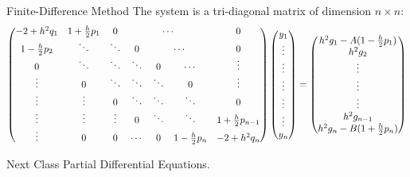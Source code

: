 \documentclass[11pt]{beamer}
\begin{document}
\begin{frame}[fragile]{Finite-Difference Method}
The system is a tri-diagonal matrix of dimension $n \times n$:
\tiny
\begin{equation}
\begin{pmatrix}
-2+h^2q_1 & 1+ \frac{h}{2}p_1& 0 &\multicolumn{3}{c}{\cdots} &0\\
1-\frac{h}{2} p_2&\ddots&\ddots & 0 &\multicolumn{2}{c}{\cdots} & 0\\
0 & \ddots & \ddots & \ddots & 0 & \cdots & \vdots\\
\vdots & 0 & \ddots & \ddots & \ddots & 0 & \vdots \\
\vdots & \vdots & 0 & \ddots & \ddots & \ddots & 0\\
\vdots & \vdots & \vdots& 0& \ddots & \ddots & 1+\frac{h}{2}p_{n-1}\\
\vdots & 0 & 0 & \cdots & 0 & 1-\frac{h}{2} p_n & -2+h^2 q_n\\
\end{pmatrix}
\begin{pmatrix}
y_1\\\vdots \\\vdots \\\vdots \\\vdots \\\vdots \\ y_n
\end{pmatrix}
= \begin{pmatrix}
h^2 g_1 - A(1-\frac{h}{2}p_1)\\
h^2 g_2\\
\vdots\\
\vdots\\
\vdots\\
h^2 g_{n-1}\\
h^2 g_n - B(1+\frac{h}{2}p_n)\\
\end{pmatrix}
\end{equation}
\end{frame}



\begin{frame}[fragile]{Next Class}
Partial Differential Equations.
\end{frame}
\end{document}
